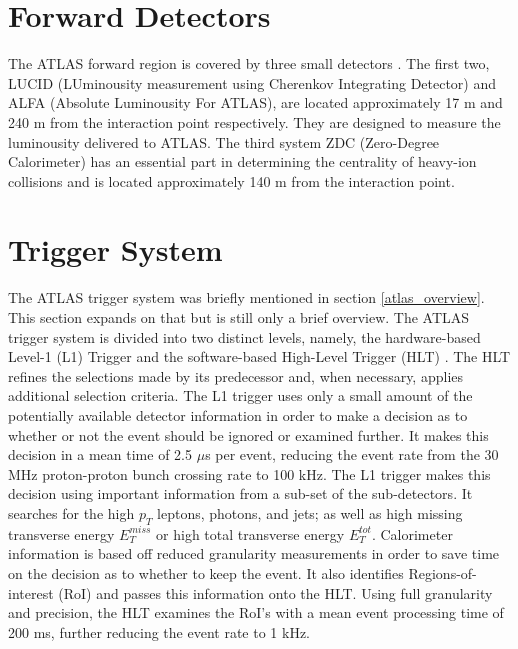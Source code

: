 \section{Forward Detectors}
The ATLAS forward region is covered by three small detectors \cite {ATLAS}. The first two, LUCID (LUminousity measurement using Cherenkov Integrating Detector) and ALFA (Absolute Luminousity For ATLAS), are located approximately 17 m and 240 m from the interaction point respectively. They are designed to measure the luminousity delivered to ATLAS. The third system ZDC (Zero-Degree Calorimeter) has an essential part in determining the centrality of heavy-ion collisions and is located approximately 140 m from the interaction point.
\section{Trigger System}
\label{trigger_system}
The ATLAS trigger system \cite {ATLAS} was briefly mentioned in section \ref{atlas_overview}. This section expands on that but is still only a brief overview. The ATLAS trigger system is divided into two distinct levels, namely, the hardware-based Level-1 (L1) Trigger \cite{l1_trigger} and the software-based High-Level Trigger (HLT) \cite{hlt}. The HLT refines the selections made by its predecessor and, when necessary, applies additional selection criteria. The L1 trigger uses only a small amount of the potentially available detector information in order to make a decision as to whether or not the event should be ignored or examined further. It makes this decision in a mean time of 2.5 $\mu$s per event, reducing the event rate from the 30 MHz proton-proton bunch crossing rate to 100 kHz. The L1 trigger makes this decision using important information from a sub-set of the sub-detectors. It searches for the high $p_{T}$ leptons, photons, and jets; as well as high missing transverse energy $E_{T}^{miss}$ or high total transverse energy $E_{T}^{tot}$. Calorimeter information is based off reduced granularity measurements in order to save time on the decision as to whether to keep the event. It also identifies Regions-of-interest (RoI) and passes this information onto the HLT. Using full granularity and precision, the HLT examines the RoI's with a mean event processing time of 200 ms, further reducing the event rate to 1 kHz. 